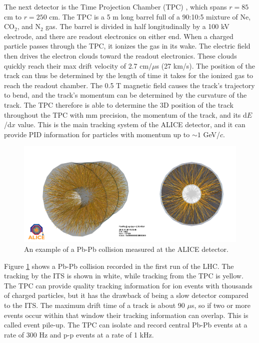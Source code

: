 The next detector is the Time Projection Chamber (TPC) \cite{ALICE:2014qrd}, which spans $r=85$ cm to $r=250$ cm.
The TPC is a 5 m long barrel full of a 90:10:5 mixture of Ne, CO$_2$, and N$_2$ gas.
The barrel is divided in half longitudinally by a 100 kV electrode, and there are readout electronics on either end.
When a charged particle passes through the TPC, it ionizes the gas in its wake.
The electric field then drives the electron clouds toward the readout electronics.
These clouds quickly reach their max drift velocity of 2.7 cm/$\mu$s (27 km/s). 
The position of the track can thus be determined by the length of time it takes for the ionized gas to reach the readout chamber.
The 0.5 T magnetic field causes the track's trajectory to bend, and the track's momentum can be determined by the curvature of the track.
The TPC therefore is able to determine the 3D position of the track throughout the TPC with mm precision, the momentum of the track, and its d$E$/d$x$ value.
This is the main tracking system of the ALICE detector, and it can provide PID information for particles with momentum up to $\sim 1$ GeV/$c$.

\begin{figure}[hbt]
\includegraphics[width=36pc]{Figures/BorrowedFigures/ExampleCollision.png}
\caption[Example of a Pb-Pb collision]{An example of a Pb-Pb collision measured at the ALICE detector.}
\label{fig:ExampleCollision}
\end{figure}
Figure \ref{fig:ExampleCollision} shows a Pb-Pb collision recorded in the first run of the LHC.
The tracking by the ITS is shown in white, while tracking from the TPC is yellow.
The TPC can provide quality tracking information for ion events with thousands of charged particles, but it has the drawback of being a slow detector compared to the ITS.
The maximum drift time of a track is about 90 $\mu$s, so if two or more events occur within that window their tracking information can overlap.
This is called event pile-up.
The TPC can isolate and record central Pb-Pb events at a rate of 300 Hz and p-p events at a rate of 1 kHz.

